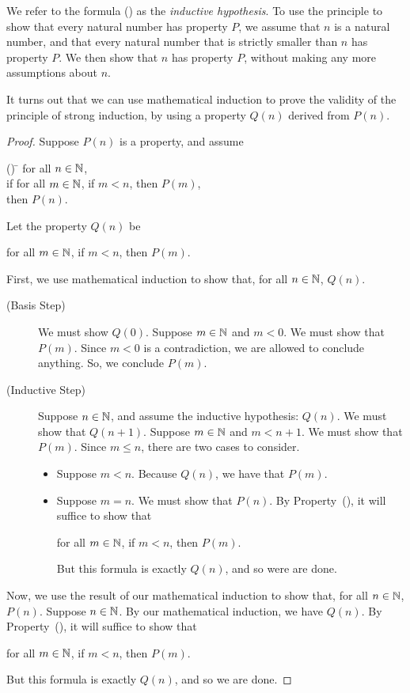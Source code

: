 We refer to the formula (\dag) as the \emph{inductive hypothesis}.
%
%
To use the principle to show that every natural number has property
$P$, we assume that $n$ is a natural number, and that
every natural number that is strictly smaller than $n$ has
property $P$.  We then show that $n$ has property $P$,
without making any more assumptions about $n$.

It turns out that we can use mathematical induction to prove the
validity of the principle of strong induction, by using a property
$Q(n)$ derived from $P(n)$.

\begin{proof}
Suppose $P(n)$ is a property, and assume
\begin{ctabbing}
(\ddag) \=\+ for all $n\in\mathbb{N}$, \\
if for all $m\in\mathbb{N}$, if $m<n$, then $P(m)$, \\
then $P(n)$.
\end{ctabbing}
Let the property $Q(n)$ be
\begin{center}
for all $m\in\mathbb{N}$, if $m<n$, then $P(m)$.
\end{center}

First, we use mathematical induction to show that, for all
$n\in\mathbb{N}$, $Q(n)$.
\begin{description}
\item[\quad(Basis Step)] We must show $Q(0)$.
Suppose $m\in\mathbb{N}$ and $m<0$.  We must show
that $P(m)$.  Since $m<0$ is a contradiction,
%
we are allowed to conclude anything.  So, we conclude $P(m)$.

\item[\quad(Inductive Step)] Suppose $n\in\mathbb{N}$, and assume
the inductive hypothesis: $Q(n)$.  We must show that $Q(n+1)$.
Suppose $m\in\mathbb{N}$ and $m<n+1$.  We must show that
$P(m)$.  Since $m\leq n$, there are two cases to consider.
\begin{itemize}
\item Suppose $m<n$.  Because $Q(n)$, we have
that $P(m)$.

\item Suppose $m=n$.  We must show that $P(n)$.
By Property~(\ddag), it will suffice to show that
\begin{center}
for all $m\in\mathbb{N}$, if $m<n$, then $P(m)$.
\end{center}
But this formula is exactly $Q(n)$, and so were are done.
\end{itemize}
\end{description}

Now, we use the result of our mathematical induction to show that, for
all $n\in\mathbb{N}$, $P(n)$.  Suppose $n\in\mathbb{N}$.  By our mathematical
induction, we have $Q(n)$.  By Property~(\ddag), it will suffice to show
that
\begin{center}
for all $m\in\mathbb{N}$, if $m<n$, then $P(m)$.
\end{center}
But this formula is exactly $Q(n)$, and so we are done.
\end{proof}

